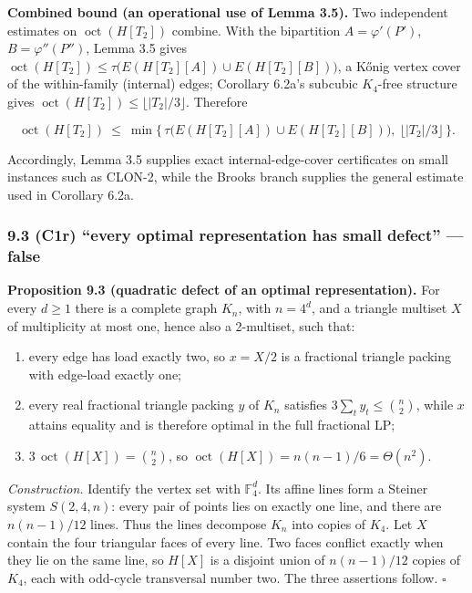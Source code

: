 \documentclass[english,11pt,a4paper]{article}
\providecommand{\tightlist}{\setlength{\itemsep}{0pt}\setlength{\parskip}{0pt}}
\begin{document}
\textbf{Combined bound (an operational use of Lemma 3.5).} Two
independent estimates on \(\operatorname{oct}(H[T_2])\) combine. With
the bipartition \(A=\varphi'(P')\), \(B=\varphi''(P'')\), Lemma 3.5
gives
\(\operatorname{oct}(H[T_2])\le\tau\!\big(E(H[T_2][A])\cup E(H[T_2][B])\big)\),
a Kőnig vertex cover of the within-family (internal) edges; Corollary
6.2a's subcubic \(K_4\)-free structure gives
\(\operatorname{oct}(H[T_2])\le\lfloor|T_2|/3\rfloor\). Therefore

\[
\operatorname{oct}(H[T_2])\ \le\ \min\Big\{\,\tau\!\big(E(H[T_2][A])\cup E(H[T_2][B])\big),\ \big\lfloor|T_2|/3\big\rfloor\,\Big\}.
\]

Accordingly, Lemma 3.5 supplies exact internal-edge-cover certificates
on small instances such as CLON-2, while the Brooks branch supplies the
general estimate used in Corollary 6.2a.

\subsubsection{9.3 (C1r) ``every optimal representation has small
defect'' ---
false}\label{c1r-every-optimal-representation-has-small-defect-false}

\textbf{Proposition 9.3 (quadratic defect of an optimal
representation).} For every \(d\ge1\) there is a complete graph \(K_n\),
with \(n=4^d\), and a triangle multiset \(X\) of multiplicity at most
one, hence also a 2-multiset, such that:

\begin{enumerate}
\def\labelenumi{\arabic{enumi}.}
\tightlist
\item
  every edge has load exactly two, so \(x=X/2\) is a fractional triangle
  packing with edge-load exactly one;
\item
  every real fractional triangle packing \(y\) of \(K_n\) satisfies
  \(3\sum_t y_t\le\binom n2\), while \(x\) attains equality and is
  therefore optimal in the full fractional LP;
\item
  \(3\,\operatorname{oct}(H[X])=\binom n2\), so
  \(\operatorname{oct}(H[X])=n(n-1)/6=\Theta(n^2)\).
\end{enumerate}

\emph{Construction.} Identify the vertex set with \(\mathbb F_4^d\). Its
affine lines form a Steiner system \(S(2,4,n)\): every pair of points
lies on exactly one line, and there are \(n(n-1)/12\) lines. Thus the
lines decompose \(K_n\) into copies of \(K_4\). Let \(X\) contain the
four triangular faces of every line. Two faces conflict exactly when
they lie on the same line, so \(H[X]\) is a disjoint union of
\(n(n-1)/12\) copies of \(K_4\), each with odd-cycle transversal number
two. The three assertions follow. \(\square\)
\end{document}
